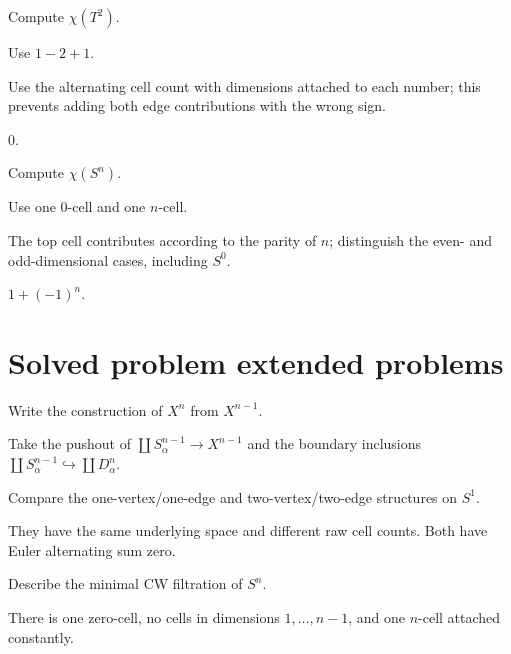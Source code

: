\begin{exercise}\label{exr:viii06-23}
Compute \(\chi(T^2)\).
\end{exercise}
\begin{hint}
Use \(1-2+1\).

Use the alternating cell count with dimensions attached to each number; this prevents adding both edge contributions with the wrong sign.
\end{hint}
\begin{solution}
\(0\).
\end{solution}

\begin{exercise}\label{exr:viii06-24}
Compute \(\chi(S^n)\).
\end{exercise}
\begin{hint}
Use one \(0\)-cell and one \(n\)-cell.

The top cell contributes according to the parity of \(n\); distinguish the even- and odd-dimensional cases, including \(S^0\).
\end{hint}
\begin{solution}
\(1+(-1)^n\).
\end{solution}


\section{Solved problem extended problems}

\begin{problem}\label{prob:viii06-01}
Write the construction of \(X^n\) from \(X^{n-1}\).
\end{problem}
\begin{solution}
Take the pushout of \(\coprod S^{n-1}_\alpha\to X^{n-1}\) and the boundary inclusions \(\coprod S^{n-1}_\alpha\hookrightarrow\coprod D^n_\alpha\).
\end{solution}

\begin{problem}\label{prob:viii06-02}
Compare the one-vertex/one-edge and two-vertex/two-edge structures on \(S^1\).
\end{problem}
\begin{solution}
They have the same underlying space and different raw cell counts.  Both have Euler alternating sum zero.
\end{solution}

\begin{problem}\label{prob:viii06-03}
Describe the minimal CW filtration of \(S^n\).
\end{problem}
\begin{solution}
There is one zero-cell, no cells in dimensions \(1,\dots,n-1\), and one \(n\)-cell attached constantly.
\end{solution}

